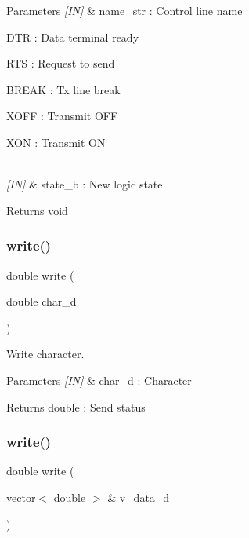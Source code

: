 \begin{DoxyParams}{Parameters}
{\em \mbox{[}\+I\+N\mbox{]}} & name\+\_\+str \+: Control line name \begin{DoxyItemize}
\item D\+TR \+: Data terminal ready \item R\+TS \+: Request to send \item B\+R\+E\+AK \+: Tx line break \item X\+O\+FF \+: Transmit O\+FF \item X\+ON \+: Transmit ON \end{DoxyItemize}
\\
\hline
{\em \mbox{[}\+I\+N\mbox{]}} & state\+\_\+b \+: New logic state \\
\hline
\end{DoxyParams}
\begin{DoxyReturn}{Returns}
void 
\end{DoxyReturn}
\mbox{\label{classuart_a3322f7e9a9f20fa53e6c1307ac1c75db}} 
\subsubsection{write()\hspace{0.1cm}{\footnotesize\ttfamily [1/4]}}
{\footnotesize\ttfamily double write (\begin{DoxyParamCaption}\item[{double}]{char\+\_\+d }\end{DoxyParamCaption})}



Write character. 


\begin{DoxyCode}{0}
\end{DoxyCode}



\begin{DoxyParams}{Parameters}
{\em \mbox{[}\+I\+N\mbox{]}} & char\+\_\+d \+: Character \\
\hline
\end{DoxyParams}
\begin{DoxyReturn}{Returns}
double \+: Send status 
\end{DoxyReturn}
\mbox{\label{classuart_a96578e29a16d696c649260d1deb7f610}} 
\subsubsection{write()\hspace{0.1cm}{\footnotesize\ttfamily [2/4]}}
{\footnotesize\ttfamily double write (\begin{DoxyParamCaption}\item[{vector$<$ double $>$ \&}]{v\+\_\+data\+\_\+d }\end{DoxyParamCaption})}



